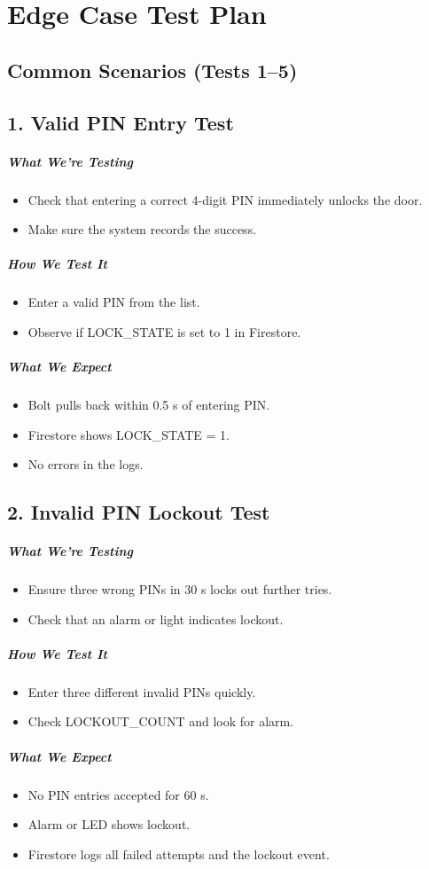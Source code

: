 \newpage
\section{Edge Case Test Plan}

\subsection*{Common Scenarios (Tests 1–5)}

\subsection*{1. Valid PIN Entry Test}
\subparagraph{What We’re Testing}
\begin{itemize}
    \item Check that entering a correct 4-digit PIN immediately unlocks the door.
    \item Make sure the system records the success.
\end{itemize}
\subparagraph{How We Test It}
\begin{itemize}
    \item Enter a valid PIN from the list.
    \item Observe if LOCK\_STATE is set to 1 in Firestore.
\end{itemize}
\subparagraph{What We Expect}
\begin{itemize}
    \item Bolt pulls back within 0.5 s of entering PIN.
    \item Firestore shows LOCK\_STATE = 1.
    \item No errors in the logs.
\end{itemize}

\subsection*{2. Invalid PIN Lockout Test}
\subparagraph{What We’re Testing}
\begin{itemize}
    \item Ensure three wrong PINs in 30 s locks out further tries.
    \item Check that an alarm or light indicates lockout.
\end{itemize}
\subparagraph{How We Test It}
\begin{itemize}
    \item Enter three different invalid PINs quickly.
    \item Check LOCKOUT\_COUNT and look for alarm.
\end{itemize}
\subparagraph{What We Expect}
\begin{itemize}
    \item No PIN entries accepted for 60 s.
    \item Alarm or LED shows lockout.
    \item Firestore logs all failed attempts and the lockout event.
\end{itemize}


